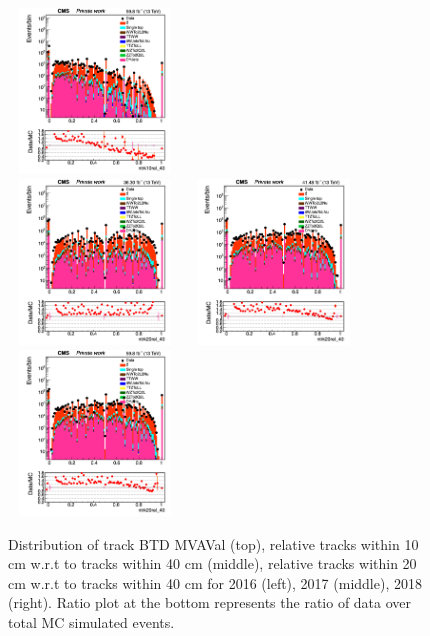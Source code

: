 \documentclass{cernatlasnote}
\begin{document}
\begin{figure}[htp]
 \includegraphics[width=4.6cm, height=4.4cm]{images/emu_channel/2018/18_Range_0pt2_1pt8/track_ntrk10rel_TRK_Log.png}\\
\includegraphics[width=4.6cm, height=4.4cm]{images/emu_channel/2016/16_Range_0pt2_1pt8/track_ntrk20rel_TRK_Log.png}
\includegraphics[width=4.6cm, height=4.4cm]{images/emu_channel/2017/17_Range_0pt2_1pt8/track_ntrk20rel_TRK_Log.png}
 \includegraphics[width=4.6cm, height=4.4cm]{images/emu_channel/2018/18_Range_0pt2_1pt8/track_ntrk20rel_TRK_Log.png}\\
  \caption{Distribution of track BTD MVAVal (top), relative tracks within 10 cm  w.r.t to tracks within 40 cm  (middle), relative tracks within 20 cm  w.r.t to tracks within 40 cm for 2016 (left), 2017 (middle), 2018 (right). Ratio plot at the bottom represents the ratio of data over total MC simulated events.}
 \label{fig:L0DATAMC}
  \end{figure}
\end{document}
